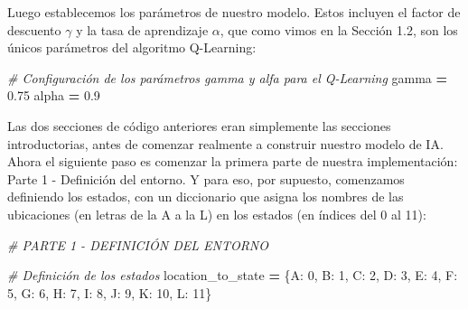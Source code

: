 \documentclass[
]{book}
\newenvironment{Shaded}{\begin{snugshade}}{\end{snugshade}}
\newcommand{\CommentTok}[1]{\textcolor[rgb]{0.56,0.35,0.01}{\textit{#1}}}
\newcommand{\DecValTok}[1]{\textcolor[rgb]{0.00,0.00,0.81}{#1}}
\newcommand{\FloatTok}[1]{\textcolor[rgb]{0.00,0.00,0.81}{#1}}
\newcommand{\NormalTok}[1]{#1}
\newcommand{\OperatorTok}[1]{\textcolor[rgb]{0.81,0.36,0.00}{\textbf{#1}}}
\newcommand{\StringTok}[1]{\textcolor[rgb]{0.31,0.60,0.02}{#1}}
\begin{document}
Luego establecemos los parámetros de nuestro modelo. Estos incluyen el factor de descuento \(\gamma\) y la tasa de aprendizaje \(\alpha\), que como vimos en la Sección 1.2, son los únicos parámetros del algoritmo Q-Learning:

\begin{Shaded}
\begin{Highlighting}[]
\CommentTok{\# Configuración de los parámetros gamma y alfa para el Q{-}Learning}
\NormalTok{gamma }\OperatorTok{=} \FloatTok{0.75}
\NormalTok{alpha }\OperatorTok{=} \FloatTok{0.9}
\end{Highlighting}
\end{Shaded}

Las dos secciones de código anteriores eran simplemente las secciones introductorias, antes de comenzar realmente a construir nuestro modelo de IA. Ahora el siguiente paso es comenzar la primera parte de nuestra implementación: Parte 1 - Definición del entorno. Y para eso, por supuesto, comenzamos definiendo los estados, con un diccionario que asigna los nombres de las ubicaciones (en letras de la A a la L) en los estados (en índices del 0 al 11):

\begin{Shaded}
\begin{Highlighting}[]
\CommentTok{\# PARTE 1 {-} DEFINICIÓN DEL ENTORNO}

\CommentTok{\# Definición de los estados}
\NormalTok{location\_to\_state }\OperatorTok{=}\NormalTok{ \{}\StringTok{\textquotesingle{}A\textquotesingle{}}\NormalTok{: }\DecValTok{0}\NormalTok{,}
                     \StringTok{\textquotesingle{}B\textquotesingle{}}\NormalTok{: }\DecValTok{1}\NormalTok{,}
                     \StringTok{\textquotesingle{}C\textquotesingle{}}\NormalTok{: }\DecValTok{2}\NormalTok{,}
                     \StringTok{\textquotesingle{}D\textquotesingle{}}\NormalTok{: }\DecValTok{3}\NormalTok{,}
                     \StringTok{\textquotesingle{}E\textquotesingle{}}\NormalTok{: }\DecValTok{4}\NormalTok{,}
                     \StringTok{\textquotesingle{}F\textquotesingle{}}\NormalTok{: }\DecValTok{5}\NormalTok{,}
                     \StringTok{\textquotesingle{}G\textquotesingle{}}\NormalTok{: }\DecValTok{6}\NormalTok{,}
                     \StringTok{\textquotesingle{}H\textquotesingle{}}\NormalTok{: }\DecValTok{7}\NormalTok{,}
                     \StringTok{\textquotesingle{}I\textquotesingle{}}\NormalTok{: }\DecValTok{8}\NormalTok{,}
                     \StringTok{\textquotesingle{}J\textquotesingle{}}\NormalTok{: }\DecValTok{9}\NormalTok{,}
                     \StringTok{\textquotesingle{}K\textquotesingle{}}\NormalTok{: }\DecValTok{10}\NormalTok{,}
                     \StringTok{\textquotesingle{}L\textquotesingle{}}\NormalTok{: }\DecValTok{11}\NormalTok{\}}
\end{Highlighting}
\end{Shaded}
\end{document}
